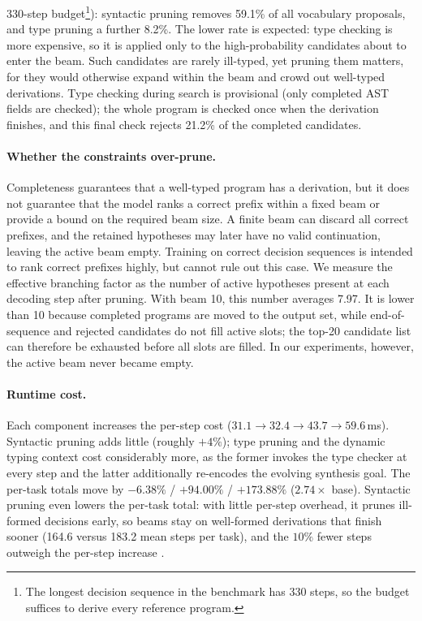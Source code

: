 \documentclass[manuscript,screen]{acmart}
\begin{document}
  {\color{revblue}330-step budget}\footnote{{\color{revblue}The longest decision sequence in the benchmark has 330 steps, so the budget suffices to derive every reference program.}}{\color{revblue}): syntactic pruning removes 59.1\% of all vocabulary proposals, and type pruning a further 8.2\%.
The lower rate is expected: type checking is more expensive, so it is applied only to } the    {\color{revblue}high-probability candidates about to enter the beam.
Such candidates are rarely ill-typed, yet pruning them matters, for they would otherwise expand within the beam and crowd out well-typed derivations.
Type checking during search is provisional (only completed AST fields are checked); the whole program is checked once when the derivation finishes, and this final check rejects 21.2\% of the completed candidates.
}

\paragraph{{\color{revblue}Whether the constraints over-prune.}}
{\color{revblue}Completeness guarantees that a well-typed program has a derivation, but it does not guarantee that the model ranks a correct prefix within a fixed beam or provide a bound on the required beam size.
A finite beam can discard all correct prefixes, and the retained hypotheses may later have no valid continuation, leaving the active beam empty.
Training on correct decision sequences is intended to rank correct prefixes highly, but cannot rule out this case.
We measure the effective branching factor as the number of active hypotheses present at each decoding step after pruning.
With beam 10, this number averages 7.97.
It is lower than 10 because completed programs are moved to the output set, while end-of-sequence and rejected candidates do not fill active slots; the top-20 candidate list can therefore be exhausted before all slots are filled.
In our experiments, however, the active beam never became empty.
}


\paragraph{{\color{revblue}Runtime cost.}}
{\color{revblue}Each component increases the per-step cost ($31.1 \to 32.4 \to 43.7 \to 59.6$\,ms).
Syntactic pruning adds little (roughly $+4\%$); type pruning and the } dynamic typing context  \textbf{} %
  {\color{revblue}cost considerably more, as the former invokes the type checker at every step and the latter additionally re-encodes the evolving synthesis goal.
The per-task totals move by $-6.38\%$ / $+94.00\%$ / $+173.88\%$ ($2.74\times$ base).
Syntactic pruning even lowers the per-task total: with little per-step overhead, it prunes ill-formed decisions early, so beams stay on well-formed derivations that finish sooner (164.6 versus 183.2 mean steps per task), and the $10\%$ fewer steps outweigh the per-step increase} .
\end{document}
